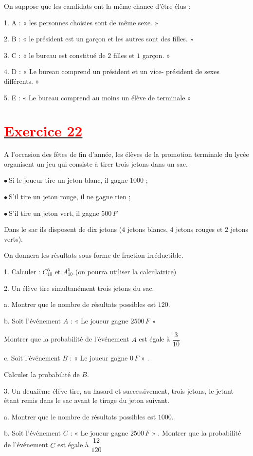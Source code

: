 \documentclass[12pt]{article}
\begin{document}
On suppose que les candidats ont la même chance d'être élus :

1. A : « les personnes choisies sont de même sexe. »

2. B : « le président est un garçon et les autres sont des filles. »

3. C : « le bureau est constitué de $2$ filles et $1$ garçon. »

4. D : « Le bureau comprend un président et un vice- président de sexes différents. »

5. E : « Le bureau comprend au moins un élève de terminale »
\section*{\underline{\textbf{\textcolor{red}{Exercice 22}}}}
A l'occasion des fêtes de fin d'année, les élèves de la promotion terminale du lycée organisent un jeu qui consiste à tirer trois jetons dans un sac.

$\bullet\ $Si le joueur tire un jeton blanc, il gagne $1000$ ;

$\bullet\ $S'il tire un jeton rouge, il ne gagne rien ; 

$\bullet\ $S'il tire un jeton vert, il gagne $500\,F$

Dans le sac ils disposent de dix jetons ($4$ jetons blancs, $4$ jetons rouges et $2$ jetons verts).

On donnera les résultats sous forme de fraction irréductible.

1. Calculer : $C_{10}^{5}$ et $A_{10}^{5}$ (on pourra utiliser la calculatrice)
	
2. Un élève tire simultanément trois jetons du sac.

a. Montrer que le nombre de résultats possibles est $120.$

b. Soit l'événement $A$ : « Le joueur gagne $2500\,F$ »

Montrer que la probabilité de l'événement $A$ est égale à $\dfrac{3}{10}$

c. Soit l'événement $B$ : « Le joueur gagne $0\,F$ » .
	
Calculer la probabilité de $B.$

3. Un deuxième élève tire, au hasard et successivement, trois jetons, le jetant étant remis dans le sac avant le tirage du jeton suivant.

a. Montrer que le nombre de résultats possibles est $1000.$

b. Soit l'événement $C$ : « Le joueur gagne $2500\,F$ » . Montrer que la probabilité de l'événement $C$ est égale à $\dfrac{12}{120}$
\end{document}
